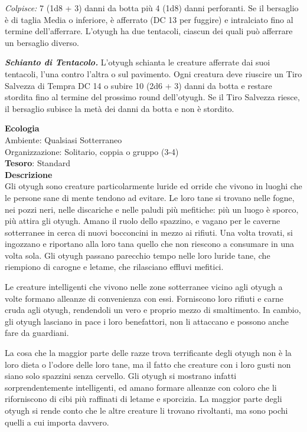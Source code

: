 \begin{multicols}{2}
	\textit{Colpisce:} 7 (1d8 + 3) danni da botta più 4 (1d8) danni perforanti. Se il bersaglio è di taglia Media o inferiore, è afferrato (DC 13 per fuggire) e intralciato fino al termine dell'afferrare. L'otyugh ha due tentacoli, ciascun dei quali può afferrare un bersaglio diverso.

	\textit{\textbf{Schianto di Tentacolo.}} L'otyugh schianta le creature afferrate dai suoi tentacoli, l'una contro l'altra o sul pavimento. Ogni creatura deve riuscire un Tiro Salvezza di Tempra DC 14 o subire 10 (2d6 + 3) danni da botta e restare stordita fino al termine del prossimo round dell'otyugh. Se il Tiro Salvezza riesce, il bersaglio subisce la metà dei danni da botta e non è stordito.

	\textbf{Ecologia}\\
	Ambiente: Qualsiasi Sotterraneo\\
	Organizzazione: Solitario, coppia o gruppo (3-4)\\
	\textbf{Tesoro}: Standard\\
	\textbf{Descrizione}\\
	Gli otyugh sono creature particolarmente luride ed orride che vivono in luoghi che le persone sane di mente tendono ad evitare. Le loro tane si trovano nelle fogne, nei pozzi neri, nelle discariche e nelle paludi più mefitiche: più un luogo è sporco, più attira gli otyugh. Amano il ruolo dello spazzino, e vagano per le caverne sotterranee in cerca di nuovi bocconcini in mezzo ai rifiuti. Una volta trovati, si ingozzano e riportano alla loro tana quello che non riescono a consumare in una volta sola. Gli otyugh passano parecchio tempo nelle loro luride tane, che riempiono di carogne e letame, che rilasciano effluvi mefitici.

	Le creature intelligenti che vivono nelle zone sotterranee vicino agli otyugh a volte formano alleanze di convenienza con essi. Forniscono loro rifiuti e carne cruda agli otyugh, rendendoli un vero e proprio mezzo di smaltimento. In cambio, gli otyugh lasciano in pace i loro benefattori, non li attaccano e possono anche fare da guardiani.

	La cosa che la maggior parte delle razze trova terrificante degli otyugh non è la loro dieta o l'odore delle loro tane, ma il fatto che creature con i loro gusti non siano solo spazzini senza cervello. Gli otyugh si mostrano infatti sorprendentemente intelligenti, ed amano formare alleanze con coloro che li riforniscono di cibi più raffinati di letame e sporcizia. La maggior parte degli otyugh si rende conto che le altre creature li trovano rivoltanti, ma sono pochi quelli a cui importa davvero.


\end{multicols}
